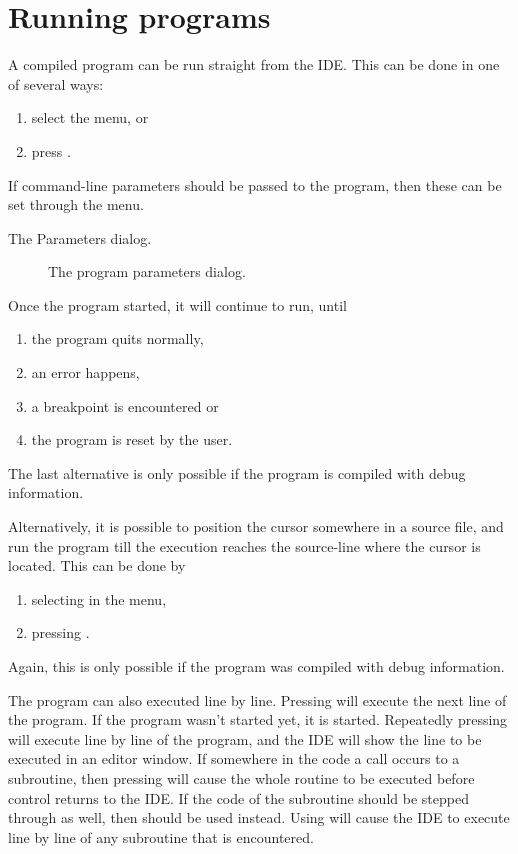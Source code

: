 \section{Running programs}
\label{se:running}
A compiled program can be run straight from the IDE. This can be done
in one of several ways:
\begin{enumerate}
\item select the  menu, or
\item press .
\end{enumerate}
If command-line parameters should be passed to the program, then these
can be set through the  menu. 
\begin{htmlonly}
The Parameters dialog.
\end{htmlonly}
\begin{latexonly}
\begin{figure}[ht]
\caption{The program parameters dialog.}\label{fig:params}
\ifpdf
{}
\else
{}
\fi
\end{figure}
\end{latexonly}

Once the program started, it will continue to run, until 
\begin{enumerate}
\item the program quits normally,
\item an error happens,
\item a breakpoint is encountered or
\item the program is reset by the user.
\end{enumerate}
The last alternative is only possible if the program is compiled
with debug information.

Alternatively, it is possible to position the cursor somewhere in a
source file, and run the program till the execution reaches the
source-line where the cursor is located. This can be done by
\begin{enumerate}
\item selecting  in the menu,
\item pressing .
\end{enumerate}
Again, this is only possible if the program was compiled with debug
information.

The program can also executed line by line. Pressing  will 
execute the next line of the program. If the program wasn't started
yet, it is started. Repeatedly pressing  will execute line 
by line of the program, and the IDE will show the line to be executed 
in an editor window. If somewhere in the code a call occurs to a subroutine,
then pressing  will cause the whole routine to be executed before
control returns to the IDE. If the code of the subroutine should be stepped
through as well, then  should be used instead. Using  will
cause the IDE to execute line by line of any subroutine that is encountered.

